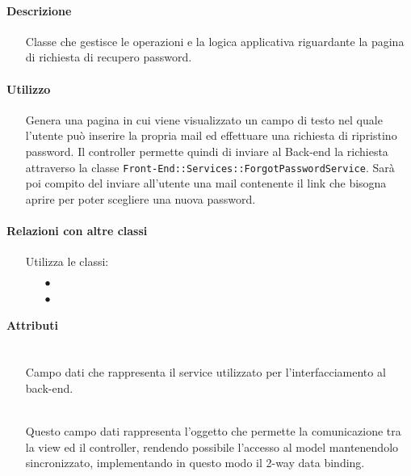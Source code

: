 \paragraph*{Descrizione}
\begin{itemize}
\item[] Classe che gestisce le operazioni e la logica applicativa riguardante la pagina di richiesta di recupero password.
\end{itemize}

\paragraph*{Utilizzo}
\begin{itemize}
\item[] Genera una pagina in cui viene visualizzato un campo di testo nel quale l'utente può inserire la propria mail ed effettuare una richiesta di ripristino password. Il controller permette quindi di inviare al Back-end la richiesta attraverso la classe \texttt{Front-End::Services::ForgotPasswordService}. Sarà poi compito del  inviare all'utente una mail contenente il link che bisogna aprire per poter scegliere una nuova password.
\end{itemize}

\paragraph*{Relazioni con altre classi}
\begin{itemize}


\item[] Utilizza le classi:
\begin{itemize}
\item[$\bullet$] 
\item[$\bullet$] 
\end{itemize}
\end{itemize}

\paragraph*{Attributi}
\begin{itemize}
\item[]  \\ Campo dati che rappresenta il service utilizzato per l'interfacciamento al back-end.
\item[]  \\ Questo campo dati rappresenta l'oggetto che permette la comunicazione tra la view ed il controller, rendendo possibile l’accesso al model mantenendolo sincronizzato, implementando in questo modo il 2-way data binding.
\end{itemize}

